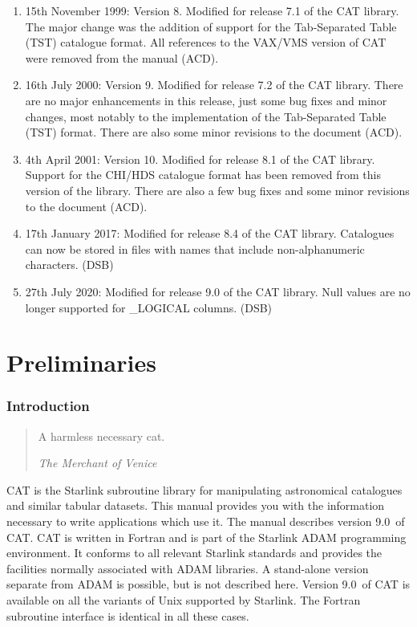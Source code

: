 \documentclass[11pt,twoside]{starlink}
\providecommand{\CATversion}{9.0~}
\begin{document}
\begin{enumerate}
  \item 15th November 1999: Version 8. Modified for release 7.1 of the
   CAT library.  The major change was the addition of support for the
   Tab-Separated Table (TST) catalogue format.  All references to
   the VAX/VMS version of CAT were removed from the manual (ACD).

  \item 16th July 2000: Version 9.  Modified for release 7.2 of the
   CAT library.  There are no major enhancements in this release, just
   some bug fixes and minor changes, most notably to the implementation
   of the Tab-Separated Table (TST) format.  There are also some minor
   revisions to the document (ACD).

  \item 4th April 2001: Version 10.  Modified for release 8.1 of the
   CAT library.  Support for the CHI/HDS catalogue format has been removed
   from this version of the library.  There are also a few bug fixes and
   some minor revisions to the document (ACD).

  \item 17th January 2017: Modified for release 8.4 of the CAT library.
   Catalogues can now be stored in files with names that include
   non-alphanumeric characters. (DSB)

  \item 27th July 2020: Modified for release 9.0 of the CAT library.
   Null values are no longer supported for _LOGICAL columns. (DSB)

\end{enumerate}


\part{Preliminaries}


\section{\label{INTRO}Introduction}

\begin{quote}
\begin{center}
A harmless necessary cat.
\end{center}
\textit{The Merchant of Venice} \latex{\raggedleft}
\end{quote}


CAT is the Starlink subroutine library for manipulating astronomical
catalogues and similar tabular datasets. This manual provides you with
the information necessary to write applications which use it. The manual
describes version \CATversion of CAT. CAT is written in Fortran
and is part of the Starlink ADAM programming environment. It conforms
to all relevant Starlink standards and provides the facilities normally
associated with ADAM libraries. A stand-alone version separate from ADAM
is possible, but is not described here. Version \CATversion of CAT is
available on all the variants of Unix supported by Starlink.  The Fortran
subroutine interface is identical in all these cases.
\end{document}
